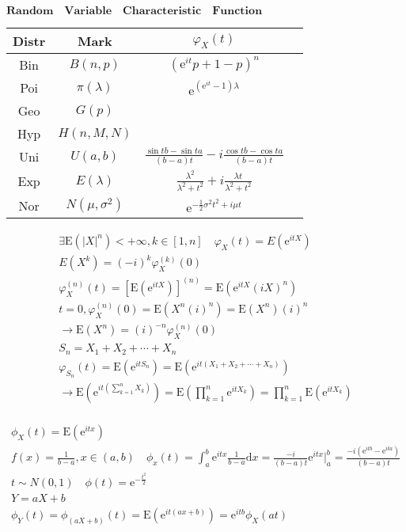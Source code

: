 \documentclass{article}
\begin{document}
$\mathbf{Random \quad Variable \quad Characteristic \quad Function}$ \\ 
\begin{tabular}{|c|c|c|c|}%
    \hline 
    Distr & Mark  & $\varphi_{X}(t)$  \\ 
    \hline 
    Bin & $B(n,p)$  & $(\mathrm{e}^{it}p+1-p)^n$ \\ 
    \hline 
    Poi & $\pi(\lambda)$  & $\mathrm{e}^{(\mathrm{e}^{it}-1)\lambda}$\\ 
    \hline 
    Geo & $G(p)$ & \\ 
    \hline 
    Hyp & $H(n,M,N)$  &\\ 
    \hline 
    Uni & $U(a,b)$  &  $\frac{\sin tb - \sin ta}{(b-a)t} - i \frac{\cos tb - \cos ta}{(b-a)t}$ \\ 
    \hline 
    Exp & $E(\lambda)$ & $\frac{\lambda^2}{\lambda^2+t^2} + i \frac{\lambda t}{\lambda^2+t^2}$ \\ 
    \hline 
    Nor & $N(\mu,\sigma^2)$ & $ \mathrm{e}^{-\frac{1}{2}\sigma^2 t^2+i\mu t}$\\ 
    \hline 
\end{tabular}

\begin{align*}
    \exists  \mathrm{E}(|X|^{n}) < +\infty, k \in [1,n] \quad \varphi_{X}(t) = E(\mathrm{e}^{itX}) \\ 
    E(X^{k}) = (-i)^{k}\varphi_{X}^{(k)}(0)  \\
    \varphi_{X}^{(n)}(t) = \left[\mathrm{E}(\mathrm{e}^{itX}) \right]^{(n)} = \mathrm{E}(\mathrm{e}^{itX} (iX)^{n})\\
    t = 0, \varphi_{X}^{(n)}(0) = \mathrm{E}(X^{n}(i)^{n}) = \mathrm{E}(X^{n}) (i)^{n}\\
    \longrightarrow \mathrm{E}(X^{n}) = (i)^{-n}\varphi_{X}^{(n)}(0)\\
    S_{n} = X_{1} + X_{2} + \cdots + X_{n} \\
    \varphi_{S_{n}}(t) = \mathrm{E}(\mathrm{e}^{itS_{n}}) = \mathrm{E}(\mathrm{e}^{it(X_{1} + X_{2} + \cdots + X_{n})})\\
    \longrightarrow \mathrm{E}(\mathrm{e}^{it\left(\sum_{k=1}^{n}X_{k}\right)}) = \mathrm{E}(\prod_{k=1}^{n}\mathrm{e}^{itX_{k}}) = \prod_{k=1}^{n}\mathrm{E}(\mathrm{e}^{itX_{k}})\\
\end{align*}

\begin{align*}
    \phi_{X}(t) = \mathrm{E}(\mathrm{e}^{itx})\\
    f(x) = \frac{1}{b-a}, x \in (a,b)\quad \phi_{x}(t) = \int_{a}^{b} \mathrm{e}^{itx}\frac{1}{b-a} \mathrm{d}x = \frac{-i}{(b-a)t} \mathrm{e}^{itx} |_{a}^{b} = \frac{-i(\mathrm{e}^{itb}-\mathrm{e}^{ita}) }{(b-a)t}\\
    t \sim N(0,1) \quad \phi(t) = \mathrm{e}^{-\frac{t^2}{2}}\\
    Y = aX + b \\ 
    \phi_{Y}(t) = \phi_{(aX+b)}(t) = \mathrm{E}(\mathrm{e}^{it(ax+b)})=\mathrm{e}^{itb}\phi_{X}(at)\\
\end{align*}
\end{document}
